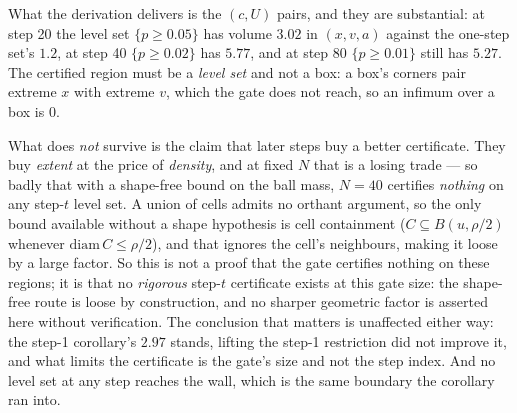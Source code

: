 \documentclass[11pt]{article}
\theoremstyle{definition}
\theoremstyle{remark}
\begin{document}
What the derivation delivers is the $(c, U)$ pairs, and they are substantial: at step 20 the level set $\{p \geq 0.05\}$ has volume $3.02$ in $(x,v,a)$ against the one-step set's $1.2$, at step 40 $\{p \geq 0.02\}$ has $5.77$, and at step 80 $\{p \geq 0.01\}$ still has $5.27$. The certified region must be a \emph{level set} and not a box: a box's corners pair extreme $x$ with extreme $v$, which the gate does not reach, so an infimum over a box is $0$.

What does \emph{not} survive is the claim that later steps buy a better certificate. They buy \emph{extent} at the price of \emph{density}, and at fixed $N$ that is a losing trade --- so badly that with a shape-free bound on the ball mass, $N = 40$ certifies \emph{nothing} on any step-$t$ level set. A union of cells admits no orthant argument, so the only bound available without a shape hypothesis is cell containment ($C \subseteq B(u,\rho/2)$ whenever $\mathrm{diam}\,C \leq \rho/2$), and that ignores the cell's neighbours, making it loose by a large factor. So this is not a proof that the gate certifies nothing on these regions; it is that no \emph{rigorous} step-$t$ certificate exists at this gate size: the shape-free route is loose by construction, and no sharper geometric factor is asserted here without verification. The conclusion that matters is unaffected either way: the step-1 corollary's $2.97$ stands, lifting the step-1 restriction did not improve it, and what limits the certificate is the gate's size and not the step index. And no level set at any step reaches the wall, which is the same boundary the corollary ran into.
\end{document}
